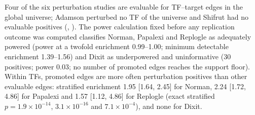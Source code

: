 \documentclass[11pt,a4paper]{article}
\begin{document}
Four of the six perturbation studies are evaluable for TF--target edges in the global universe; Adamson perturbed no TF of the universe and Shifrut had no evaluable positives (, ).
The power calculation fixed before any replication outcome was computed classifies Norman, Papalexi and Replogle as adequately powered (power at a twofold enrichment 0.99--1.00; minimum detectable enrichment 1.39--1.56) and Dixit as underpowered and uninformative (30 positives; power 0.03; no number of promoted edges reaches the support floor).
Within TFs, promoted edges are more often perturbation positives than other evaluable edges: stratified enrichment 1.95 [1.64, 2.45] for Norman, 2.24 [1.72, 4.86] for Papalexi and 1.57 [1.12, 4.86] for Replogle (exact stratified $p=\ensuremath{1.9\times10^{-14}}$, \ensuremath{3.1\times10^{-16}} and \ensuremath{7.1\times10^{-4}}), and none for Dixit.
\end{document}
